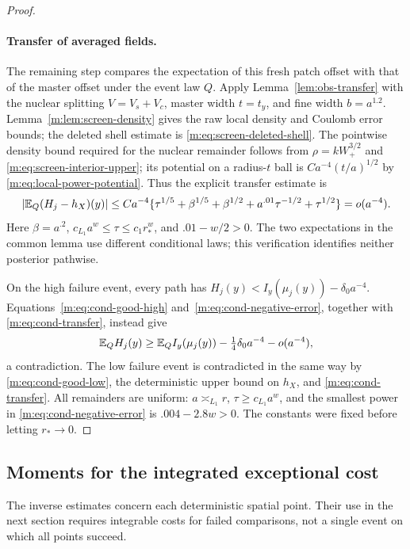 \begin{proof}
\paragraph{Transfer of averaged fields.}
The remaining step compares the expectation of this fresh patch
offset with that of the master offset under the event law $Q$.
Apply Lemma~\ref{lem:obs-transfer} with the nuclear splitting
$V=V_s+V_c$, master width $t=t_y$, and fine width $b=a^{1.2}$.
Lemma~\ref{m:lem:screen-density} gives the raw local density and Coulomb
error bounds; the deleted shell estimate is
\eqref{m:eq:screen-deleted-shell}. The pointwise density bound required
for the nuclear remainder follows from
$\rho=kW_+^{3/2}$ and \eqref{m:eq:screen-interior-upper}; its potential
on a radius-$t$ ball is $Ca^{-4}(t/a)^{1/2}$ by
\eqref{m:eq:local-power-potential}.
Thus the explicit transfer estimate is
\begin{equation}\label{m:eq:cond-transfer}
 |\mathbb E_Q(H_j-h_X)(y)|
 \le Ca^{-4}\{\tau^{1/5}+\beta^{1/5}+\beta^{1/2}
                +a^{.01}\tau^{-1/2}+\tau^{1/2}\}=o(a^{-4}).
\end{equation}
Here $\beta=a^{.2}$, $c_{L_1}a^w\le\tau\le c_1r_*^w$, and
$.01-w/2>0$. The two expectations in the common lemma use different
conditional laws; this verification identifies neither posterior pathwise.

On the high failure event, every path has
$H_j(y)<I_y(\mu_j(y))-\delta_0a^{-4}$.
Equations~\eqref{m:eq:cond-good-high} and~\eqref{m:eq:cond-negative-error},
together with \eqref{m:eq:cond-transfer}, instead give
\[
 \mathbb E_QH_j(y)\ge\mathbb E_QI_y(\mu_j(y))
                 -\tfrac14\delta_0a^{-4}-o(a^{-4}),
\]
a contradiction. The low failure event is contradicted in the same
way by \eqref{m:eq:cond-good-low}, the deterministic upper bound on
$h_X$, and \eqref{m:eq:cond-transfer}. All remainders are uniform:
$a\asymp_{L_1}r$, $\tau\ge c_{L_1}a^w$, and the smallest power
in \eqref{m:eq:cond-negative-error} is $.004-2.8w>0$.
The constants were fixed before letting $r_*\to0$.
\end{proof}

\subsection{Moments for the integrated exceptional cost}

The inverse estimates concern each deterministic spatial point.
Their use in the next section requires integrable costs for failed
comparisons, not a single event on which all points succeed.

